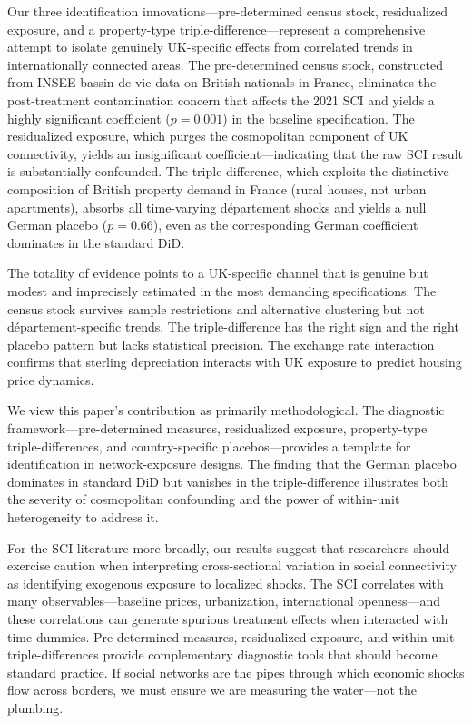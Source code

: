 \documentclass[12pt]{article}
\begin{document}
Our three identification innovations---pre-determined census stock, residualized exposure, and a property-type triple-difference---represent a comprehensive attempt to isolate genuinely UK-specific effects from correlated trends in internationally connected areas. The pre-determined census stock, constructed from INSEE bassin de vie data on British nationals in France, eliminates the post-treatment contamination concern that affects the 2021 SCI and yields a highly significant coefficient ($p = 0.001$) in the baseline specification. The residualized exposure, which purges the cosmopolitan component of UK connectivity, yields an insignificant coefficient---indicating that the raw SCI result is substantially confounded. The triple-difference, which exploits the distinctive composition of British property demand in France (rural houses, not urban apartments), absorbs all time-varying d\'epartement shocks and yields a null German placebo ($p = 0.66$), even as the corresponding German coefficient dominates in the standard DiD.

The totality of evidence points to a UK-specific channel that is genuine but modest and imprecisely estimated in the most demanding specifications. The census stock survives sample restrictions and alternative clustering but not d\'epartement-specific trends. The triple-difference has the right sign and the right placebo pattern but lacks statistical precision. The exchange rate interaction confirms that sterling depreciation interacts with UK exposure to predict housing price dynamics.

We view this paper's contribution as primarily methodological. The diagnostic framework---pre-determined measures, residualized exposure, property-type triple-differences, and country-specific placebos---provides a template for identification in network-exposure designs. The finding that the German placebo dominates in standard DiD but vanishes in the triple-difference illustrates both the severity of cosmopolitan confounding and the power of within-unit heterogeneity to address it.

For the SCI literature more broadly, our results suggest that researchers should exercise caution when interpreting cross-sectional variation in social connectivity as identifying exogenous exposure to localized shocks. The SCI correlates with many observables---baseline prices, urbanization, international openness---and these correlations can generate spurious treatment effects when interacted with time dummies. Pre-determined measures, residualized exposure, and within-unit triple-differences provide complementary diagnostic tools that should become standard practice. If social networks are the pipes through which economic shocks flow across borders, we must ensure we are measuring the water---not the plumbing.
\end{document}
